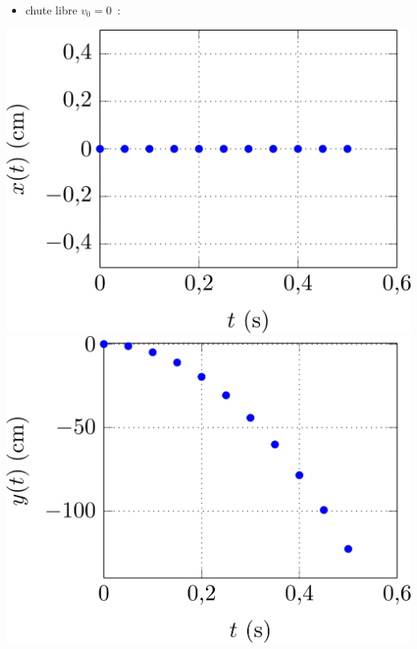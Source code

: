 \documentclass[../../main/main.tex]{subfiles}
\begin{document}
\begin{minipage}{0.31\linewidth}
	\begin{itemize}
		\item chute libre $v_0 = 0$~:
	\end{itemize}
	\begin{center}
		\includegraphics[width=\linewidth]{x_nov}
		\includegraphics[width=\linewidth]{y_nov}
	\end{center}
\end{minipage}
\hfill
\end{document}
